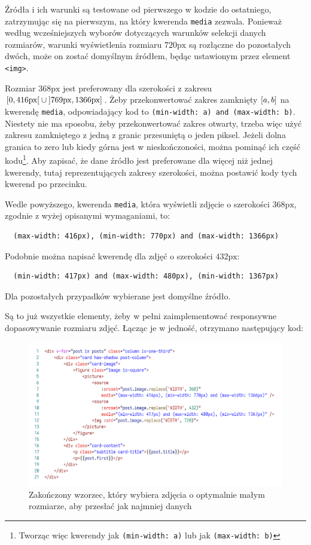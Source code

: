 \documentclass[licencjacka]{pracadypl}
\newcommand{\selfnote}[1]{\colorbox{pink}{#1}}
\begin{document}
Źródła i ich warunki są testowane od pierwszego w kodzie do ostatniego, zatrzymując się na pierwszym, na który kwerenda \texttt{media} zezwala.
Ponieważ według wcześniejszych wyborów dotyczących warunków selekcji danych rozmiarów, warunki wyświetlenia rozmiaru $720\text{px}$ są rozłączne do pozostałych dwóch, może on zostać domyślnym źródłem, będąc ustawionym przez element \texttt{<img>}.  


Rozmiar $368\text{px}$ jest preferowany dla szerokości z zakresu $\rinterval{0}{416\text{px}} \cup \linterval{769\text{px}}{1366\text{px}}$. Żeby przekonwertować zakres zamknięty $\interval{a}{b}$ na kwerendę \texttt{media}, odpowiadający kod to \texttt{(min-width: a) and (max-width: b)}. Niestety nie ma sposobu, żeby przekonwertować zakres otwarty, trzeba więc użyć zakresu zamkniętego z jedną z granic przesuniętą o jeden piksel. Jeżeli dolna granica to zero lub kiedy górna jest w nieskończoności, można pominąć ich część kodu\footnote{Tworząc więc kwerendy jak \texttt{(min-width: a)} lub jak \texttt{(max-width: b)}}. Aby zapisać, że dane źródło jest preferowane dla więcej niż jednej kwerendy, tutaj reprezentujących zakresy szerokości, można postawić kody tych kwerend po przecinku.

Wedle powyższego, kwerenda \texttt{media}, która wyświetli zdjęcie o szerokości $368\text{px}$, zgodnie z wyżej opisanymi wymaganiami, to:
\begin{verbatim}
  (max-width: 416px), (min-width: 770px) and (max-width: 1366px)
\end{verbatim}
Podobnie można napisać kwerendę dla zdjęć o szerokości $432\text{px}$:
\begin{verbatim}
  (min-width: 417px) and (max-width: 480px), (min-width: 1367px)
\end{verbatim}
Dla pozostałych przypadków wybierane jest domyślne źródło. 

Są to już wszystkie elementy, żeby w pełni zaimplementować responsywne dopasowywanie rozmiaru zdjęć. Łącząc je w jedność, otrzymano następujący kod:

\begin{figure}[H]
  \includegraphics[width=\linewidth]{images/code-vue-image-card-done.png}
  \caption{Zakończony wzorzec, który wybiera zdjęcia o optymalnie małym rozmiarze, aby przesłać jak najmniej danych}
  \label{fig:code-vue-template-articles-done}
\end{figure}
\end{document}
